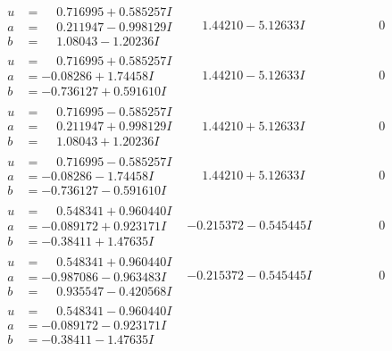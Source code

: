\documentclass[1p]{elsarticle_modified}
\theoremstyle{definition}
\begin{document}
$$\begin{array}{c|c|c}
\begin{aligned}
u &= \phantom{-}0.716995 + 0.585257 I \\
a &= \phantom{-}0.211947 - 0.998129 I \\
b &= \phantom{-}1.08043 - 1.20236 I\end{aligned}
 & \phantom{-}1.44210 - 5.12633 I & \phantom{-0.000000 } 0 \\ \hline\begin{aligned}
u &= \phantom{-}0.716995 + 0.585257 I \\
a &= -0.08286 + 1.74458 I \\
b &= -0.736127 + 0.591610 I\end{aligned}
 & \phantom{-}1.44210 - 5.12633 I & \phantom{-0.000000 } 0 \\ \hline\begin{aligned}
u &= \phantom{-}0.716995 - 0.585257 I \\
a &= \phantom{-}0.211947 + 0.998129 I \\
b &= \phantom{-}1.08043 + 1.20236 I\end{aligned}
 & \phantom{-}1.44210 + 5.12633 I & \phantom{-0.000000 } 0 \\ \hline\begin{aligned}
u &= \phantom{-}0.716995 - 0.585257 I \\
a &= -0.08286 - 1.74458 I \\
b &= -0.736127 - 0.591610 I\end{aligned}
 & \phantom{-}1.44210 + 5.12633 I & \phantom{-0.000000 } 0 \\ \hline\begin{aligned}
u &= \phantom{-}0.548341 + 0.960440 I \\
a &= -0.089172 + 0.923171 I \\
b &= -0.38411 + 1.47635 I\end{aligned}
 & -0.215372 - 0.545445 I & \phantom{-0.000000 } 0 \\ \hline\begin{aligned}
u &= \phantom{-}0.548341 + 0.960440 I \\
a &= -0.987086 - 0.963483 I \\
b &= \phantom{-}0.935547 - 0.420568 I\end{aligned}
 & -0.215372 - 0.545445 I & \phantom{-0.000000 } 0 \\ \hline\begin{aligned}
u &= \phantom{-}0.548341 - 0.960440 I \\
a &= -0.089172 - 0.923171 I \\
b &= -0.38411 - 1.47635 I\end{aligned}

\end{array}$$
\end{document}

